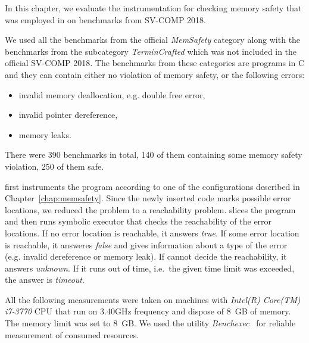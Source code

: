 In this chapter, we evaluate the instrumentation for checking memory safety
that was employed in \symbiotic on benchmarks from SV-COMP 2018.

We used all the benchmarks from the official \emph{MemSafety} category along
with the benchmarks from the subcategory \emph{TerminCrafted} which was not
included in the official SV-COMP 2018. The benchmarks from these categories are
programs in C and they can contain either no violation of memory safety, or the
following errors:
\begin{itemize}
  \item invalid memory deallocation, e.g. double free error,
  \item invalid pointer dereference,
  \item memory leaks.
\end{itemize}
There were 390 benchmarks in total, 140 of them containing some
memory safety violation, 250 of them safe.


\symbiotic first instruments the program according to one of the configurations
described in Chapter~\ref{chap:memsafety}. Since the newly inserted code marks
possible error locations, we reduced the problem to a reachability problem.
\symbiotic slices the program and then runs symbolic executor \klee that checks
the reachability of the error locations. If no error location is reachable, it
answers \emph{true}. If some error location is reachable, it answeres
\emph{false} and gives information about a type of the error (e.g.  invalid
dereference or memory leak). If \symbiotic cannot decide the reachability, it
answers \emph{unknown}. If it runs out of time, i.e.~the given time limit
was exceeded, the answer is \emph{timeout}.

All the following measurements were taken on machines with \textit{Intel(R)
Core(TM) i7-3770} CPU that run on 3.40GHz frequency and dispose of 8~GB of
memory. The memory limit was set to 8~GB. We used the utility
\emph{Benchexec}~\cite{Beyer2015} for reliable measurement of consumed
resources.

